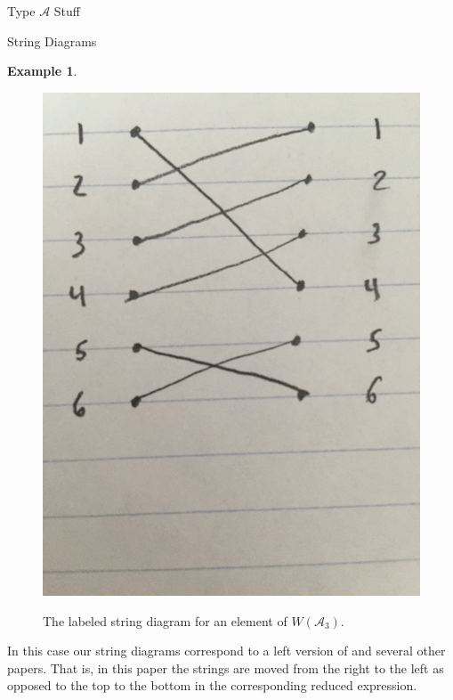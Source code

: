 \documentclass[11pt]{amsart}
\theoremstyle{definition}
\newtheorem{example}[theorem]{Example}
\numberwithin{equation}{section}
\newcommand{\A}{\mathcal{A}}
\renewcommand{\(}{\left(}
\renewcommand{\)}{\right)}
\begin{document}
\begin{section}{Type $\A$ Stuff}
\begin{subsection}{String Diagrams}
\begin{example}
\begin{figure}[!ht]
{\includegraphics[scale=.05]{firststring.jpg}}
\caption{The labeled string diagram for an element of $W(\A_3)$.}
\end{figure}

In this case our string diagrams correspond to a left version of \cite{Jones.B:A} and several other papers. That is, in this paper the strings are moved from the right to the left as opposed to the top to the bottom in the corresponding reduced expression.
 
\end{example}
\end{subsection}


\end{section}
\end{document}
